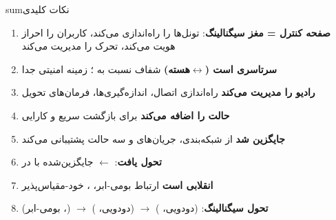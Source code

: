\begin{CNbox}[unbreakable]{sum}{نکات کلیدی}

\begin{enumerate}
\def\labelenumi{\arabic{enumi}.}
\tightlist
\item
  \textbf{صفحه کنترل = مغز سیگنالینگ}: تونل‌ها را راه‌اندازی می‌کند، کاربران را احراز هویت می‌کند، تحرک را مدیریت می‌کند
\item
  \textbf{ سرتاسری است (\ensuremath{\leftrightarrow}هسته)}  شفاف نسبت به ؛ زمینه امنیتی جدا
\item
  \textbf{ رادیو را مدیریت می‌کند}  راه‌اندازی اتصال، اندازه‌گیری‌ها، فرمان‌های تحویل
\item
  \textbf{ حالت  را اضافه می‌کند} برای بازگشت سریع و کارایی 
\item
  \textbf{ جایگزین  شد}  از شبکه‌بندی، جریان‌های  و سه حالت  پشتیبانی می‌کند
\item
  \textbf{ تحول یافت}:  \ensuremath{\leftarrow} جایگزین‌شده با  در 
\item
  \textbf{ انقلابی است}  ارتباط  بومی-ابر، ، خود-مقیاس‌پذیر
\item
  \textbf{تحول سیگنالینگ}:  (دودویی، ) \ensuremath{\to}  (دودویی، ) \ensuremath{\to}  (، بومی-ابر)
\end{enumerate}

\end{CNbox}
